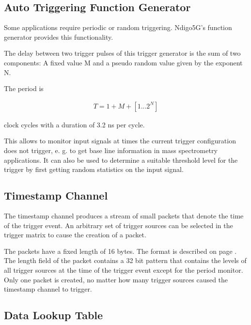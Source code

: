     \subsection{Auto Triggering Function Generator\label{cp:AutoTriggeringFunctionGenerator}}
    
        Some applications require periodic or random triggering. Ndigo5G's function generator provides this functionality.\par

        The delay between two trigger pulses of this trigger generator is the sum of two components: A fixed value M and a pseudo random value given by the exponent N. \par

        The period is

        \begin{align}
            T = 1 + M + [1...2^N]
        \end{align}

        clock cycles with a duration of 3.2 ns per cycle.\par
        
        This allows to monitor input signals at times the current trigger configuration does not trigger, e. g. to get base line information in mass spectrometry applications. It can also be used to determine a suitable threshold level for the trigger by first getting random statistics on the input signal.	
    
    \subsection{Timestamp Channel}

        The timestamp channel produces a stream of small packets that denote the time of the trigger event. An arbitrary set of trigger sources can be selected in the trigger matrix to cause the creation of a packet.\par
        
        The packets have a fixed length of 16 bytes. The format is described on page \pageref{cp:packetformat}. The length field of the packet contains a 32 bit pattern that contains the levels of all trigger sources at the time of the trigger event except for the period monitor. Only one packet is created, no matter how many trigger sources caused the timestamp channel to trigger.	
    
    \subsection{Data Lookup Table}
    
